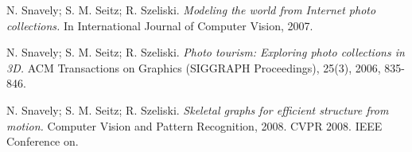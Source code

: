 \begin{thebibliography}{99}
  {\sc N. Snavely; S. M. Seitz; R. Szeliski.} 
  \emph{Modeling the world from Internet photo collections.}
  In International Journal of Computer Vision, 2007.

  {\sc N. Snavely; S. M. Seitz; R. Szeliski.} 
  \emph{Photo tourism: Exploring photo collections in 3D.}
  ACM Transactions on Graphics (SIGGRAPH Proceedings), 25(3), 2006, 835-846.

  {\sc N. Snavely; S. M. Seitz; R. Szeliski.} 
  \emph{Skeletal graphs for efficient structure from motion.}
  Computer Vision and Pattern Recognition, 2008. CVPR 2008. IEEE Conference on.



\end{thebibliography}

